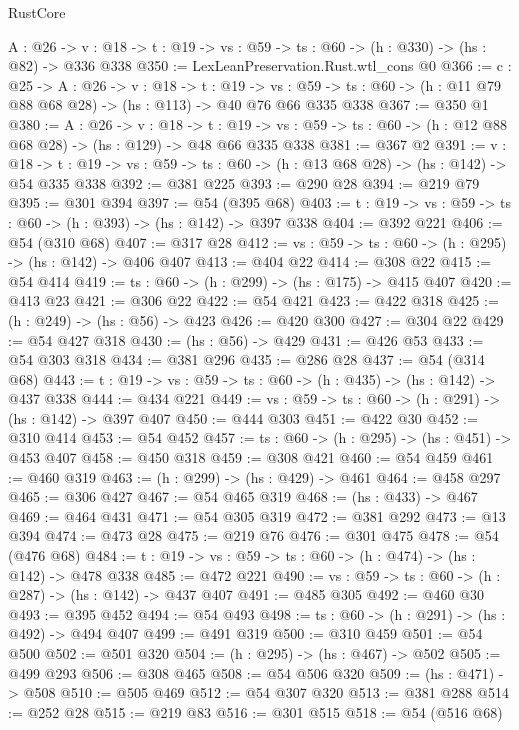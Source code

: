 \begin{lexlean}{RustCore}
\begin{coremodule}
  {A : @26} ->
  {v : @18} -> {t : @19} -> {vs : @59} -> {ts : @60} -> (h : @330) -> (hs : @82) -> @336 @338
@350 := LexLeanPreservation.Rust.wtl_cons @0
@366 := {c : @25} ->
  {A : @26} ->
  {v : @18} ->
  {t : @19} ->
  {vs : @59} -> {ts : @60} -> (h : @11 @79 @88 @68 @28) -> (hs : @113) -> @40 @76 @66 @335 @338
@367 := @350 @1
@380 := {A : @26} ->
  {v : @18} ->
  {t : @19} -> {vs : @59} -> {ts : @60} -> (h : @12 @88 @68 @28) -> (hs : @129) -> @48 @66 @335 @338
@381 := @367 @2
@391 := {v : @18} ->
  {t : @19} -> {vs : @59} -> {ts : @60} -> (h : @13 @68 @28) -> (hs : @142) -> @54 @335 @338
@392 := @381 @225
@393 := @290 @28
@394 := @219 @79
@395 := @301 @394
@397 := @54 (@395 @68)
@403 := {t : @19} -> {vs : @59} -> {ts : @60} -> (h : @393) -> (hs : @142) -> @397 @338
@404 := @392 @221
@406 := @54 (@310 @68)
@407 := @317 @28
@412 := {vs : @59} -> {ts : @60} -> (h : @295) -> (hs : @142) -> @406 @407
@413 := @404 @22
@414 := @308 @22
@415 := @54 @414
@419 := {ts : @60} -> (h : @299) -> (hs : @175) -> @415 @407
@420 := @413 @23
@421 := @306 @22
@422 := @54 @421
@423 := @422 @318
@425 := (h : @249) -> (hs : @56) -> @423
@426 := @420 @300
@427 := @304 @22
@429 := @54 @427 @318
@430 := (hs : @56) -> @429
@431 := @426 @53
@433 := @54 @303 @318
@434 := @381 @296
@435 := @286 @28
@437 := @54 (@314 @68)
@443 := {t : @19} -> {vs : @59} -> {ts : @60} -> (h : @435) -> (hs : @142) -> @437 @338
@444 := @434 @221
@449 := {vs : @59} -> {ts : @60} -> (h : @291) -> (hs : @142) -> @397 @407
@450 := @444 @303
@451 := @422 @30
@452 := @310 @414
@453 := @54 @452
@457 := {ts : @60} -> (h : @295) -> (hs : @451) -> @453 @407
@458 := @450 @318
@459 := @308 @421
@460 := @54 @459
@461 := @460 @319
@463 := (h : @299) -> (hs : @429) -> @461
@464 := @458 @297
@465 := @306 @427
@467 := @54 @465 @319
@468 := (hs : @433) -> @467
@469 := @464 @431
@471 := @54 @305 @319
@472 := @381 @292
@473 := @13 @394
@474 := @473 @28
@475 := @219 @76
@476 := @301 @475
@478 := @54 (@476 @68)
@484 := {t : @19} -> {vs : @59} -> {ts : @60} -> (h : @474) -> (hs : @142) -> @478 @338
@485 := @472 @221
@490 := {vs : @59} -> {ts : @60} -> (h : @287) -> (hs : @142) -> @437 @407
@491 := @485 @305
@492 := @460 @30
@493 := @395 @452
@494 := @54 @493
@498 := {ts : @60} -> (h : @291) -> (hs : @492) -> @494 @407
@499 := @491 @319
@500 := @310 @459
@501 := @54 @500
@502 := @501 @320
@504 := (h : @295) -> (hs : @467) -> @502
@505 := @499 @293
@506 := @308 @465
@508 := @54 @506 @320
@509 := (hs : @471) -> @508
@510 := @505 @469
@512 := @54 @307 @320
@513 := @381 @288
@514 := @252 @28
@515 := @219 @83
@516 := @301 @515
@518 := @54 (@516 @68)

\end{coremodule}
\end{lexlean}
